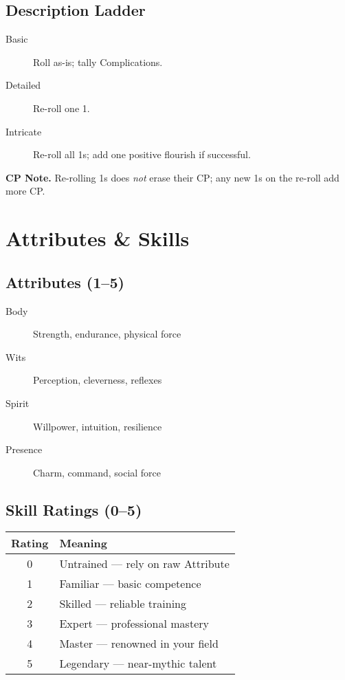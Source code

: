 \subsection*{Description Ladder}
\begin{description}
  \item[Basic] Roll as-is; tally Complications.
  \item[Detailed] Re-roll one 1.
  \item[Intricate] Re-roll all 1s; add one positive flourish if successful.
\end{description}

\noindent\textbf{CP Note.} Re-rolling 1s does \emph{not} erase their CP; any new 1s on the re-roll add more CP.

\section{Attributes \& Skills}

\subsection*{Attributes (1–5)}
\begin{description}
  \item[Body] Strength, endurance, physical force
  \item[Wits] Perception, cleverness, reflexes
  \item[Spirit] Willpower, intuition, resilience
  \item[Presence] Charm, command, social force
\end{description}

\subsection*{Skill Ratings (0–5)}
\begin{center}
\begin{tabular}{cl}
\toprule
\textbf{Rating} & \textbf{Meaning} \\
\midrule
0 & Untrained — rely on raw Attribute \\
1 & Familiar — basic competence \\
2 & Skilled — reliable training \\
3 & Expert — professional mastery \\
4 & Master — renowned in your field \\
5 & Legendary — near-mythic talent \\
\bottomrule
\end{tabular}
\end{center}

